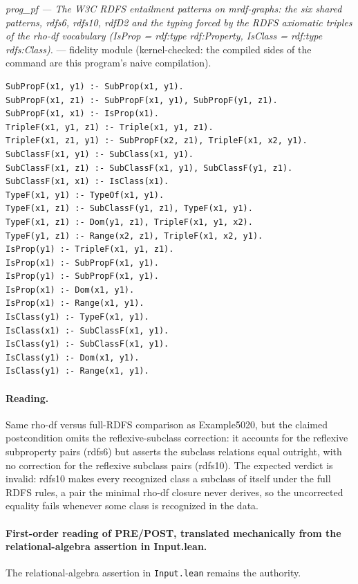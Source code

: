 \documentclass[10pt]{article}
\begin{document}
{\raggedright\textit{prog\_pf --- The W3C RDFS entailment patterns on mrdf-graphs: the six shared patterns, rdfs6, rdfs10, rdfD2 and the typing forced by the RDFS axiomatic triples of the rho-df vocabulary (IsProp = rdf:type rdf:Property, IsClass = rdf:type rdfs:Class).} --- fidelity module (kernel-checked: the compiled sides of the command are this program's naive compilation).\par}

\begin{Verbatim}[fontsize=\scriptsize,breaklines=true,breakanywhere=true,frame=single,framesep=1.5mm]
SubPropF(x1, y1) :- SubProp(x1, y1).
SubPropF(x1, z1) :- SubPropF(x1, y1), SubPropF(y1, z1).
SubPropF(x1, x1) :- IsProp(x1).
TripleF(x1, y1, z1) :- Triple(x1, y1, z1).
TripleF(x1, z1, y1) :- SubPropF(x2, z1), TripleF(x1, x2, y1).
SubClassF(x1, y1) :- SubClass(x1, y1).
SubClassF(x1, z1) :- SubClassF(x1, y1), SubClassF(y1, z1).
SubClassF(x1, x1) :- IsClass(x1).
TypeF(x1, y1) :- TypeOf(x1, y1).
TypeF(x1, z1) :- SubClassF(y1, z1), TypeF(x1, y1).
TypeF(x1, z1) :- Dom(y1, z1), TripleF(x1, y1, x2).
TypeF(y1, z1) :- Range(x2, z1), TripleF(x1, x2, y1).
IsProp(y1) :- TripleF(x1, y1, z1).
IsProp(x1) :- SubPropF(x1, y1).
IsProp(y1) :- SubPropF(x1, y1).
IsProp(x1) :- Dom(x1, y1).
IsProp(x1) :- Range(x1, y1).
IsClass(y1) :- TypeF(x1, y1).
IsClass(x1) :- SubClassF(x1, y1).
IsClass(y1) :- SubClassF(x1, y1).
IsClass(y1) :- Dom(x1, y1).
IsClass(y1) :- Range(x1, y1).
\end{Verbatim}

\paragraph{Reading.} Same rho-df versus full-RDFS comparison as Example5020, but the claimed postcondition omits the reflexive-subclass correction: it accounts for the reflexive subproperty pairs (rdfs6) but asserts the subclass relations equal outright, with no correction for the reflexive subclass pairs (rdfs10). The expected verdict is invalid: rdfs10 makes every recognized class a subclass of itself under the full RDFS rules, a pair the minimal rho-df closure never derives, so the uncorrected equality fails whenever some class is recognized in the data.

\paragraph{First-order reading of PRE/POST, translated mechanically from the relational-algebra assertion in Input.lean.} The relational-algebra assertion in \texttt{Input.lean} remains the authority.
\end{document}
